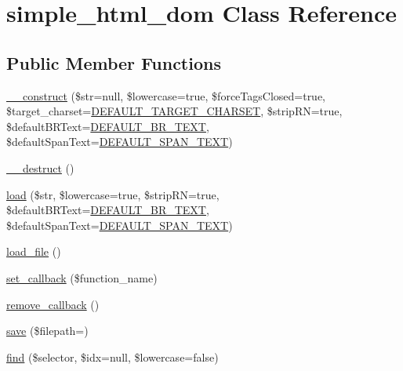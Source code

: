 \hypertarget{classsimple__html__dom}{}\section{simple\+\_\+html\+\_\+dom Class Reference}
\label{classsimple__html__dom}
\subsection*{Public Member Functions}
\begin{DoxyCompactItemize}
\item 
\hyperlink{classsimple__html__dom_a867090eb38a7d76f8df0b46d22a5226a}{\+\_\+\+\_\+construct} (\$str=null, \$lowercase=true, \$force\+Tags\+Closed=true, \$target\+\_\+charset=\hyperlink{simple__html__dom_8php_aeb01f6d83a65d695ad327473f838319a}{D\+E\+F\+A\+U\+L\+T\+\_\+\+T\+A\+R\+G\+E\+T\+\_\+\+C\+H\+A\+R\+S\+ET}, \$strip\+RN=true, \$default\+B\+R\+Text=\hyperlink{simple__html__dom_8php_a898bdf60fe4d05c1c50013eed5e2c6e8}{D\+E\+F\+A\+U\+L\+T\+\_\+\+B\+R\+\_\+\+T\+E\+XT}, \$default\+Span\+Text=\hyperlink{simple__html__dom_8php_a30d58d7d3a53efc61f064b53a434bafe}{D\+E\+F\+A\+U\+L\+T\+\_\+\+S\+P\+A\+N\+\_\+\+T\+E\+XT})
\item 
\hyperlink{classsimple__html__dom_a421831a265621325e1fdd19aace0c758}{\+\_\+\+\_\+destruct} ()
\item 
\hyperlink{classsimple__html__dom_a240a32865f9d9ea1fa681917547a65a5}{load} (\$str, \$lowercase=true, \$strip\+RN=true, \$default\+B\+R\+Text=\hyperlink{simple__html__dom_8php_a898bdf60fe4d05c1c50013eed5e2c6e8}{D\+E\+F\+A\+U\+L\+T\+\_\+\+B\+R\+\_\+\+T\+E\+XT}, \$default\+Span\+Text=\hyperlink{simple__html__dom_8php_a30d58d7d3a53efc61f064b53a434bafe}{D\+E\+F\+A\+U\+L\+T\+\_\+\+S\+P\+A\+N\+\_\+\+T\+E\+XT})
\item 
\hyperlink{classsimple__html__dom_acbf45344758b1a521534cc9cc8ebc5f5}{load\+\_\+file} ()
\item 
\hyperlink{classsimple__html__dom_a40e8b7bf2a1b1acc56b82f9221fb9266}{set\+\_\+callback} (\$function\+\_\+name)
\item 
\hyperlink{classsimple__html__dom_a0af324763ae6d1a475455af727fc5037}{remove\+\_\+callback} ()
\item 
\hyperlink{classsimple__html__dom_a6e80614bedc0513a210906c36f608fa8}{save} (\$filepath=\textquotesingle{}\textquotesingle{})
\item 
\hyperlink{classsimple__html__dom_afbf375e355aa32c25f7e389a04ddced0}{find} (\$selector, \$idx=null, \$lowercase=false)

\end{DoxyCompactItemize}
